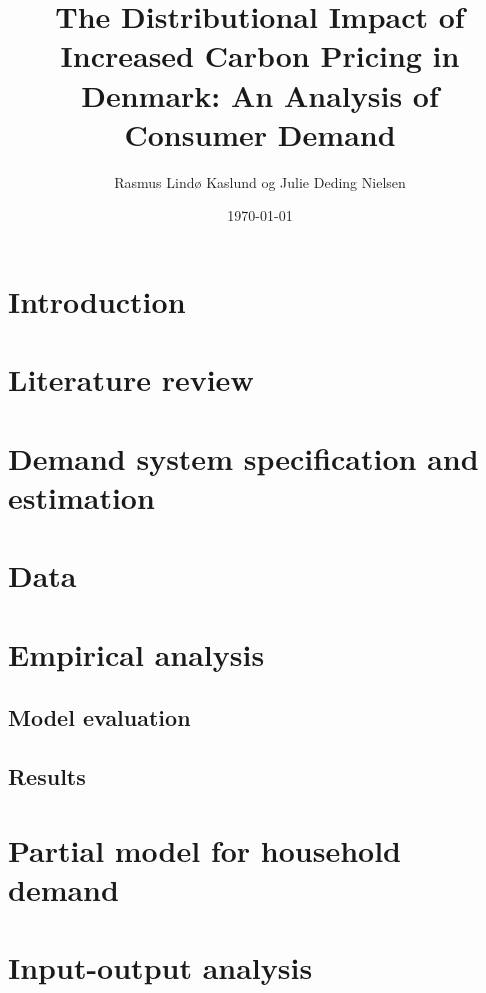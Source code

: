 \documentclass{article}
\title{The Distributional Impact of Increased Carbon Pricing in Denmark: An Analysis of Consumer Demand}
\author{Rasmus Lindø Kaslund og Julie Deding Nielsen}
\date{\today}
\begin{document}
\maketitle

\newpage
\tableofcontents

\newpage

\section{Introduction}


\section{Literature review}\label{sec:litrev}


\section{Demand system specification and estimation}



\section{Data}\label{sec:data}


\section{Empirical analysis}

\subsection{Model evaluation}


\subsection{Results}


\section{Partial model for household demand}\label{sec:partialmodel}


\section{Input-output analysis}\label{sec:iomodel}

\end{document}

